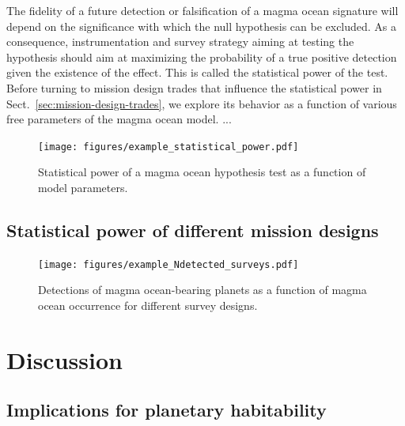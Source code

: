 \documentclass[modern]{aastex631}
\begin{document}
\begin{note}
   The fidelity of a future detection or falsification of a magma ocean signature will depend on the significance with which the null hypothesis can be excluded.
   As a consequence, instrumentation and survey strategy aiming at testing the hypothesis should aim at maximizing the probability of a true positive detection given the existence of the effect.
   This is called the statistical power of the test.
   Before turning to mission design trades that influence the statistical power in Sect.~\ref{sec:mission-design-trades}, we explore its behavior as a function of various free parameters of the magma ocean model.
    ...
\begin{figure}[ht!]
    \begin{centering}
        \texttt{[image: figures/example\_statistical\_power.pdf]}
        \caption{
        Statistical power of a magma ocean hypothesis test as a function of model parameters.
        }
        \label{fig:statistical_power}
    \end{centering}
\end{figure}

\end{note}

\subsection{Statistical power of different mission designs}\label{sec:statpower_missions}

\begin{figure}[ht!]
    \begin{centering}

        \texttt{[image: figures/example\_Ndetected\_surveys.pdf]}
        \caption{
        Detections of magma ocean-bearing planets as a function of magma ocean occurrence for different survey designs.
        }
        \label{fig:example_Ndetected_surveys}
    \end{centering}
\end{figure}

\section{Discussion}

\subsection{Implications for planetary habitability}\label{sec:habitability}
\end{document}
